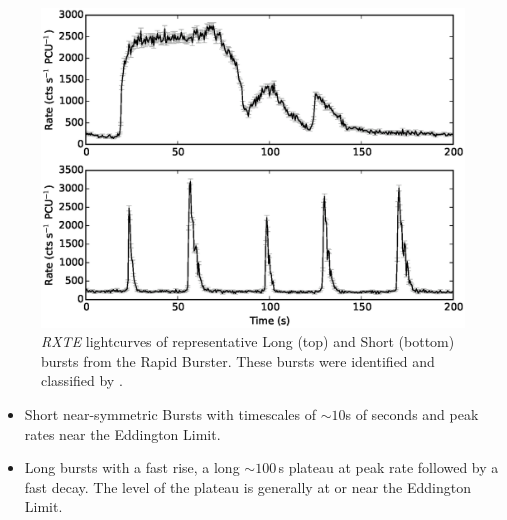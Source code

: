 \begin{figure}
  \centering
  \includegraphics[width=.9\linewidth, trim={0.8cm 0 1.4cm 0},clip]{images/bagnoli_bursts.eps}
  \caption[\textit{RXTE} lightcurves of representative Long (top) and Short (bottom) bursts from the Rapid Burster.]{\small \textit{RXTE} lightcurves of representative Long (top) and Short (bottom) bursts from the Rapid Burster.  These bursts were identified and classified by \citet{Bagnoli_PopStudy}.}
  \label{fig:bagnoli_lcs}
\end{figure}

\begin{itemize}
\item Short near-symmetric Bursts with timescales of $\sim10$s of seconds and peak rates near the Eddington Limit.
\item Long bursts with a fast rise, a long $\sim100$\,s plateau at peak rate followed by a fast decay.  The level of the plateau is generally at or near the Eddington Limit.
\end{itemize}

